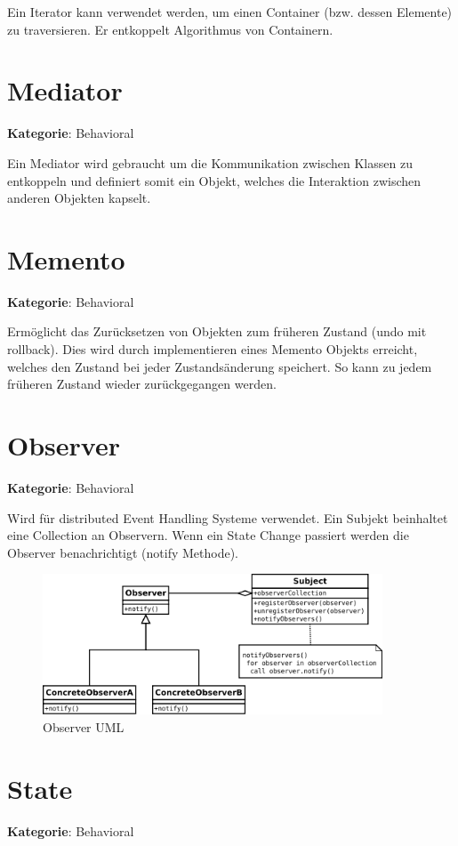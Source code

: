 Ein Iterator kann verwendet werden, um einen Container (bzw. dessen Elemente) zu traversieren. Er entkoppelt Algorithmus von Containern.

\section{Mediator}
\textbf{Kategorie}: Behavioral

Ein Mediator wird gebraucht um die Kommunikation zwischen Klassen zu entkoppeln und definiert somit ein Objekt, welches die Interaktion zwischen anderen Objekten kapselt.

\section{Memento}
\textbf{Kategorie}: Behavioral

Ermöglicht das Zurücksetzen von Objekten zum früheren Zustand (undo mit rollback).
Dies wird durch implementieren eines Memento Objekts erreicht, welches den Zustand bei jeder Zustandsänderung speichert. So kann zu jedem früheren Zustand wieder zurückgegangen werden.

\section{Observer}
\textbf{Kategorie}: Behavioral

Wird für distributed Event Handling Systeme verwendet. Ein Subjekt beinhaltet eine Collection an Observern. Wenn ein State Change passiert werden die Observer benachrichtigt (notify Methode).


\begin{figure}[H]
	\centering
	\includegraphics[width=0.9\textwidth]{content/gof/images/14-observer-uml.png}
	\caption{Observer UML}
\end{figure}


\section{State}
\textbf{Kategorie}: Behavioral

